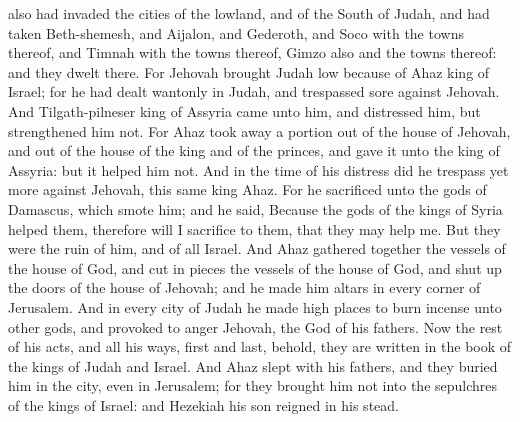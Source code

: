 also had invaded the cities of the lowland, and of the South of Judah, and had taken Beth-shemesh, and Aijalon, and Gederoth, and Soco with the towns thereof, and Timnah with the towns thereof, Gimzo also and the towns thereof: and they dwelt there. For Jehovah brought Judah low because of Ahaz king of Israel; for he had dealt wantonly in Judah, and trespassed sore against Jehovah. And Tilgath-pilneser king of Assyria came unto him, and distressed him, but strengthened him not. For Ahaz took away a portion out of the house of Jehovah, and out of the house of the king and of the princes, and gave it unto the king of Assyria: but it helped him not.  And in the time of his distress did he trespass yet more against Jehovah, this same king Ahaz. For he sacrificed unto the gods of Damascus, which smote him; and he said, Because the gods of the kings of Syria helped them, therefore will I sacrifice to them, that they may help me. But they were the ruin of him, and of all Israel. And Ahaz gathered together the vessels of the house of God, and cut in pieces the vessels of the house of God, and shut up the doors of the house of Jehovah; and he made him altars in every corner of Jerusalem. And in every city of Judah he made high places to burn incense unto other gods, and provoked to anger Jehovah, the God of his fathers. Now the rest of his acts, and all his ways, first and last, behold, they are written in the book of the kings of Judah and Israel. And Ahaz slept with his fathers, and they buried him in the city, even in Jerusalem; for they brought him not into the sepulchres of the kings of Israel: and Hezekiah his son reigned in his stead. 


